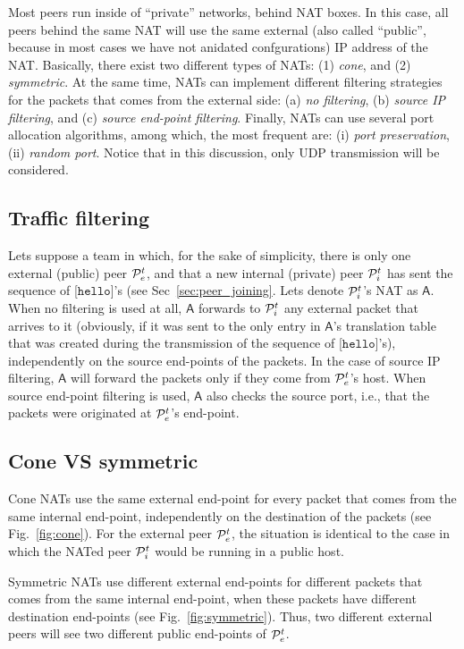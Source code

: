 
Most peers run inside of ``private'' networks, behind NAT boxes. In
this case, all peers behind the same NAT will use the same external
(also called ``public'', because in most cases we have not anidated
confgurations) IP address of the NAT. Basically, there exist two
different types of NATs: (1) \emph{cone}, and (2) \emph{symmetric}. At
the same time, NATs can implement different filtering strategies for
the packets that comes from the external side: (a) \emph{no
  filtering}, (b) \emph{source IP filtering}, and (c) \emph{source
  end-point filtering}. Finally, NATs can use several port allocation
algorithms, among which, the most frequent are: (i) \emph{port
  preservation}, (ii) \emph{random port}. Notice that in this
discussion, only UDP transmission will be considered.

\subsection{Traffic filtering}
Lets suppose a team in which, for the sake of simplicity, there is
only one external (public) peer ${\cal P}^t_e$, and that a new
internal (private) peer ${\cal P}^t_i$ has sent the sequence of
[$\mathtt{hello}$]'s (see Sec~\ref{sec:peer_joining}. Lets denote
${\cal P}^t_i$'s NAT as $\mathsf{A}$. When no filtering is used at
all, $\mathsf{A}$ forwards to ${\cal P}^t_i$ any external packet
that arrives to it (obviously, if it was sent to the only entry in
$\mathsf{A}$'s translation table that was created during the
transmission of the sequence of [$\mathtt{hello}$]'s), independently
on the source end-points of the packets. In the case of source IP
filtering, $\mathsf{A}$ will forward the packets only if they come
from ${\cal P}^t_e$'s host.  When source end-point filtering is used,
$\mathsf{A}$ also checks the source port, i.e., that the packets
were originated at ${\cal P}^t_e$'s end-point.

\subsection{Cone VS symmetric}
Cone NATs use the same external end-point for every packet that comes
from the same internal end-point, independently on the destination of
the packets (see Fig.~\ref{fig:cone}). For the external peer ${\cal
  P}^t_e$, the situation is identical to the case in which the NATed
peer ${\cal P}^t_i$ would be running in a public host.

Symmetric NATs use different external end-points for different packets
that comes from the same internal end-point, when these packets have
different destination end-points (see Fig.~\ref{fig:symmetric}). Thus,
two different external peers will see two different public end-points
of ${\cal P}^t_e$.

